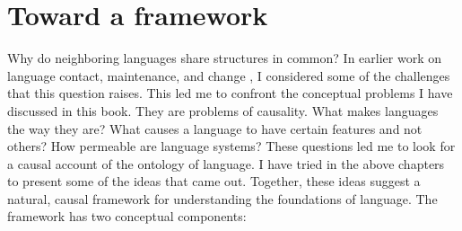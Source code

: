 \section{Toward a framework}

Why do neighboring languages share structures in common? In earlier work on language contact, maintenance, and change \citep{enfield_linguistic_2003,enfield_areal_2005,enfield_transmission_2008,enfield_linguistic_2011}, I considered some of the challenges that this question raises. This led me to confront the conceptual problems I have discussed in this book. They are problems of causality. What makes languages the way they are? What causes a language to have certain features and not others? How permeable are language systems? These questions led me to look for a causal account of the ontology of language. I have tried in the above chapters to present some of the ideas that came out. Together, these ideas suggest a natural, causal framework for understanding the foundations of language. The framework has two conceptual components:
